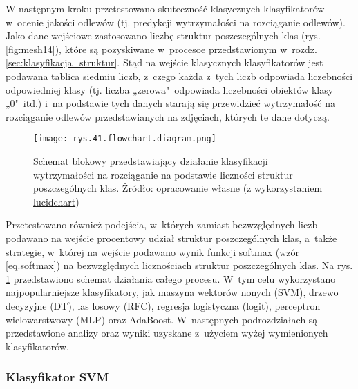 W następnym kroku przetestowano skuteczność klasycznych klasyfikatorów w~ocenie jakości odlewów (tj. predykcji wytrzymałości na rozciąganie odlewów). Jako dane wejściowe zastosowano liczbę struktur poszczególnych klas (rys. \ref{fig:mesh14}), które są pozyskiwane w~procesoe przedstawionym w~rozdz. \ref{sec:klasyfikacja_struktur}. Stąd na wejście klasycznych klasyfikatorów jest podawana tablica siedmiu liczb, z~czego każda z~tych liczb odpowiada liczebności odpowiedniej klasy (tj. liczba „zerowa"~odpowiada liczebności obiektów klasy „0"~itd.) i~na podstawie tych danych starają się przewidzieć wytrzymałość na rozciąganie odlewów przedstawianych na zdjęciach, których te dane dotyczą. 
\begin{figure}[h]
    \centering
    \texttt{[image: rys.41.flowchart.diagram.png]}
    \caption{Schemat blokowy przedstawiający działanie klasyfikacji wytrzymałości na rozciąganie na podstawie liczności struktur poszczególnych klas. Żródło: opracowanie własne (z wykorzystaniem \href{https://www.lucidchart.com}{lucidchart})}
    \label{rys.41.flowchart.diagram.png}
\end{figure}
Przetestowano również podejścia, w~których zamiast bezwzględnych liczb podawano na wejście procentowy udział struktur poszczególnych klas, a~także strategie, w~której na wejście podawano wynik funkcji softmax (wzór \ref{eq.softmax}) na bezwzględnych licznościach struktur poszczególnych klas. Na rys. \ref{rys.41.flowchart.diagram.png} przedstawiono schemat działania całego procesu.
W~tym celu wykorzystano najpopularniejsze klasyfikatory, jak maszyna wektorów nonych (SVM), drzewo decyzyjne (DT), las losowy (RFC), regresja logistyczna (logit), perceptron wielowarstwowy (MLP) oraz AdaBoost. W~następnych podrozdziałach są przedstawione analizy oraz wyniki uzyskane z~użyciem wyżej wymienionych klasyfikatorów.

\subsubsection{Klasyfikator SVM}
\label{structures.with.svm}

